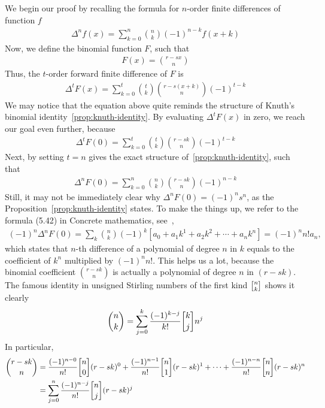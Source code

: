 
We begin our proof by
recalling the formula for $n$-order finite differences of function $f$
\begin{align*}
  \Delta^{n} f(x) = \sum_{k=0}^{n} \binom{n}{k} (-1)^{n-k} f(x+k)
\end{align*}
Now, we define the binomial function $F$, such that
\begin{align*}
  F(x) = \binom{r-sx}{n}
\end{align*}
Thus, the $t$-order forward finite difference of $F$ is
\begin{align*}
  \Delta^{t} F(x)
  = \sum_{k=0}^{t} \binom{t}{k} \binom{r-s(x+k)}{n} (-1)^{t-k}
\end{align*}
We may notice that the equation above quite reminds the structure of
Knuth's binomial identity~\eqref{prop:knuth-identity}.
By evaluating $\Delta^{t} F(x)$ in zero, we reach our goal even further,
because
\begin{align*}
  \Delta^{t} F(0)
  = \sum_{k=0}^{t} \binom{t}{k} \binom{r-sk}{n} (-1)^{t-k}
\end{align*}
Next, by setting $t=n$ gives the exact structure
of~\eqref{prop:knuth-identity}, such that
\begin{align*}
  \Delta^{n} F(0) = \sum_{k=0}^{n} \binom{n}{k} \binom{r-sk}{n} (-1)^{n-k}
\end{align*}
Still, it may not be immediately clear why $\Delta^{n} F(0) = (-1)^n s^n$,
as the Proposition~\eqref{prop:knuth-identity} states.
To make the things up,
we refer to the formula (5.42) in Concrete mathematics,
see~\cite[p. 190]{graham1994concrete},
\begin{align*}
  (-1)^n \Delta^{n} F(0)
  = \sum_{k} \binom{n}{k} (-1)^k
  \left[
    a_0 + a_1 k^1 + a_2 k^2 + \cdots + a_n k^n
  \right]
  = (-1)^n n! a_n,
\end{align*}
which states that $n$-th difference of a polynomial of degree $n$ in $k$ equals
to the coefficient of $k^n$ multiplied by $(-1)^n n!$.
This helps us a lot, because the binomial coefficient
$\binom{r-sk}{n}$ is actually a polynomial of degree $n$ in $(r-sk)$.
The famous identity in unsigned Stirling numbers of the first kind $\stirlingi{n}{k}$
shows it clearly
\begin{align*}
  \binom{n}{k}
  = \sum_{j=0}^{k} \frac{(-1)^{k-j}}{k!} \stirlingi{k}{j} n^j
\end{align*}
In particular,
\begin{align*}
  \binom{r-sk}{n}
  &= \frac{(-1)^{n-0}}{n!} \stirlingi{n}{0} (r-sk)^0
  + \frac{(-1)^{n-1}}{n!} \stirlingi{n}{1} (r-sk)^1
  + \cdots
  + \frac{(-1)^{n-n}}{n!} \stirlingi{n}{n} (r-sk)^n \\
  &= \sum_{j=0}^{n} \frac{(-1)^{n-j}}{n!} \stirlingi{n}{j} (r-sk)^j
\end{align*}
